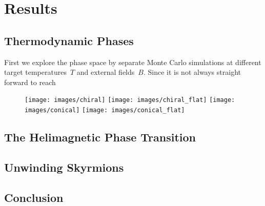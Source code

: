 %
\chapter{Results}\label{chap:2}
%
%
\section{Thermodynamic Phases}\label{sec:phases}
%
First we explore the phase space by separate Monte Carlo simulations at
different target temperatures~$T$ and external fields~$B$. Since it is not
always straight forward to reach

\begin{figure}
  \centering
  \texttt{[image: images/chiral]}
  \hspace{1cm}
  \texttt{[image: images/chiral\_flat]}
  \hfill
  \texttt{[image: images/conical]}
  \hspace{1cm}
  \texttt{[image: images/conical\_flat]}
  \caption{\todo{}}
\label{fig:chiralconical}
\end{figure}

%
\section{The Helimagnetic Phase Transition}\label{sec:details}
%
%
\section{Unwinding Skyrmions}\label{sec:transitions}
%
%
\section{Conclusion}\label{sec:conclusion}
%
